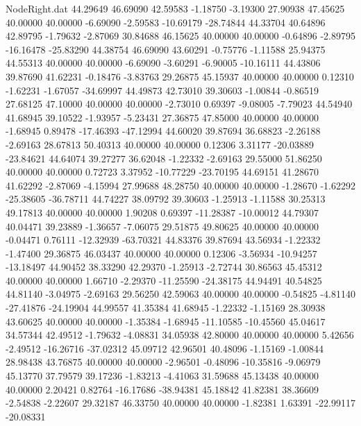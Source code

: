 \begin{filecontents}{NodeRight.dat}
  44.29649   46.69090   42.59583    -1.18750   -3.19300   27.90938   47.45625   40.00000   40.00000   -6.69090   -2.59583  -10.69179  -28.74844
  44.33704   40.64896   42.89795    -1.79632   -2.87069   30.84688   46.15625   40.00000   40.00000   -0.64896   -2.89795  -16.16478  -25.83290
  44.38754   46.69090   43.60291    -0.75776   -1.11588   25.94375   44.55313   40.00000   40.00000   -6.69090   -3.60291   -6.90005  -10.16111
  44.43806   39.87690   41.62231    -0.18476   -3.83763   29.26875   45.15937   40.00000   40.00000    0.12310   -1.62231   -1.67057  -34.69997
  44.49873   42.73010   39.30603    -1.00844   -0.86519   27.68125   47.10000   40.00000   40.00000   -2.73010    0.69397   -9.08005   -7.79023
  44.54940   41.68945   39.10522    -1.93957   -5.23431   27.36875   47.85000   40.00000   40.00000   -1.68945    0.89478  -17.46393  -47.12994
  44.60020   39.87694   36.68823    -2.26188   -2.69163   28.67813   50.40313   40.00000   40.00000    0.12306    3.31177  -20.03889  -23.84621
  44.64074   39.27277   36.62048    -1.22332   -2.69163   29.55000   51.86250   40.00000   40.00000    0.72723    3.37952  -10.77229  -23.70195
  44.69151   41.28670   41.62292    -2.87069   -4.15994   27.99688   48.28750   40.00000   40.00000   -1.28670   -1.62292  -25.38605  -36.78711
  44.74227   38.09792   39.30603    -1.25913   -1.11588   30.25313   49.17813   40.00000   40.00000    1.90208    0.69397  -11.28387  -10.00012
  44.79307   40.04471   39.23889    -1.36657   -7.06075   29.51875   49.80625   40.00000   40.00000   -0.04471    0.76111  -12.32939  -63.70321
  44.83376   39.87694   43.56934    -1.22332   -1.47400   29.36875   46.03437   40.00000   40.00000    0.12306   -3.56934  -10.94257  -13.18497
  44.90452   38.33290   42.29370    -1.25913   -2.72744   30.86563   45.45312   40.00000   40.00000    1.66710   -2.29370  -11.25590  -24.38175
  44.94491   40.54825   44.81140    -3.04975   -2.69163   29.56250   42.59063   40.00000   40.00000   -0.54825   -4.81140  -27.41876  -24.19904
  44.99557   41.35384   41.68945    -1.22332   -1.15169   28.30938   43.60625   40.00000   40.00000   -1.35384   -1.68945  -11.10585  -10.45560
  45.04617   34.57344   42.49512    -1.79632   -4.08831   34.05938   42.80000   40.00000   40.00000    5.42656   -2.49512  -16.26716  -37.02312
  45.09712   42.96501   40.48096    -1.15169   -1.00844   28.98438   43.76875   40.00000   40.00000   -2.96501   -0.48096  -10.35816   -9.06979
  45.13770   37.79579   39.17236    -1.83213   -4.41063   31.59688   45.13438   40.00000   40.00000    2.20421    0.82764  -16.17686  -38.94381
  45.18842   41.82381   38.36609    -2.54838   -2.22607   29.32187   46.33750   40.00000   40.00000   -1.82381    1.63391  -22.99117  -20.08331

\end{filecontents}
